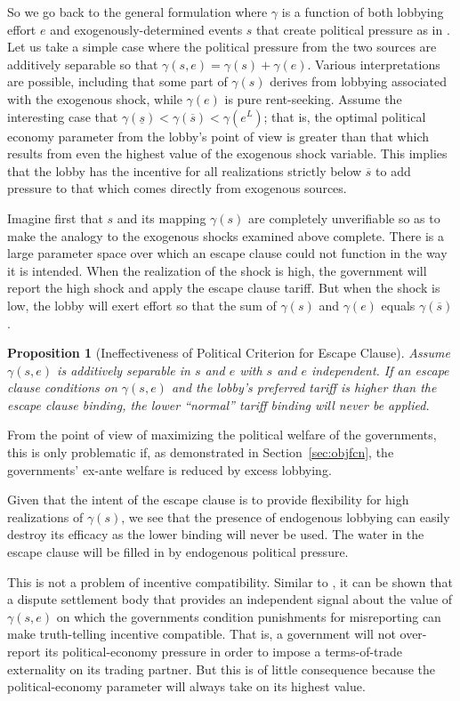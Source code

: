 \documentclass[12pt]{article}
\newtheorem{proposition}{Proposition}
\newcommand{\ov}{\overline}
\newcommand{\un}{\underline}
\newcommand{\ga}{\gamma}
\begin{document}
So we go back to the general formulation where $\ga$ is a function of both lobbying effort $e$ and exogenously-determined events $s$ that create political pressure as in \Textcite{ms2011}. Let us take a simple case where the political pressure from the two sources are additively separable so that $\ga(s,e) = \ga(s) + \ga(e)$. Various interpretations are possible, including that some part of $\ga(s)$ derives from lobbying associated with the exogenous shock, while $\ga(e)$ is pure rent-seeking. Assume the interesting case that $\ga(\un{s}) < \ga(\ov{s}) < \ga(e^L)$; that is, the optimal political economy parameter from the lobby's point of view is greater than that which results from even the highest value of the exogenous shock variable. This implies that the lobby has the incentive for all realizations strictly below $\ov{s}$ to add pressure to that which comes directly from exogenous sources.

Imagine first that $s$ and its mapping $\ga(s)$ are completely unverifiable so as to make the analogy to the exogenous shocks examined above complete. There is a large parameter space over which an escape clause could not function in the way it is intended. When the realization of the shock is high, the government will report the high shock and apply the escape clause tariff. But when the shock is low, the lobby will exert effort so that the sum of $\ga(s)$ and $\ga(e)$ equals $\ga(\ov{s})$.

\begin{proposition}[Ineffectiveness of Political Criterion for Escape Clause]
    Assume $\ga(s,e)$ is additively separable in $s$ and $e$ with $s$ and $e$ independent. If an escape clause conditions on $\ga(s,e)$ and the lobby's preferred tariff is higher than the escape clause binding, the lower ``normal'' tariff binding will never be applied.
\end{proposition}

From the point of view of maximizing the political welfare of the governments, this is only problematic if, as demonstrated in Section~\ref{sec:objfcn}, the governments' ex-ante welfare is reduced by excess lobbying.

Given that the intent of the escape clause is to provide flexibility for high realizations of $\ga(s)$, we see that the presence of endogenous lobbying can easily destroy its efficacy as the lower binding will never be used. The water in the escape clause will be filled in by endogenous political pressure.

This is not a problem of incentive compatibility. Similar to \Textcite{beshkar2010b}, it can be shown that a dispute settlement body that provides an independent signal about the value of $\ga(s,e)$ on which the governments condition punishments for misreporting can make truth-telling incentive compatible. That is, a government will not over-report its political-economy pressure in order to impose a terms-of-trade externality on its trading partner. But this is of little consequence because the political-economy parameter will always take on its highest value.
\end{document}
